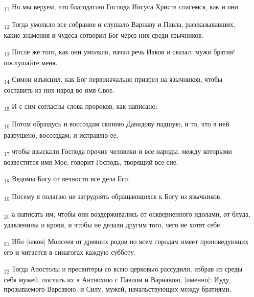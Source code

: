 \begin{tcolorbox}
\textsubscript{11} Но мы веруем, что благодатию Господа Иисуса Христа спасемся, как и они.
\end{tcolorbox}
\begin{tcolorbox}
\textsubscript{12} Тогда умолкло все собрание и слушало Варнаву и Павла, рассказывавших, какие знамения и чудеса сотворил Бог через них среди язычников.
\end{tcolorbox}
\begin{tcolorbox}
\textsubscript{13} После же того, как они умолкли, начал речь Иаков и сказал: мужи братия! послушайте меня.
\end{tcolorbox}
\begin{tcolorbox}
\textsubscript{14} Симон изъяснил, как Бог первоначально призрел на язычников, чтобы составить из них народ во имя Свое.
\end{tcolorbox}
\begin{tcolorbox}
\textsubscript{15} И с сим согласны слова пророков, как написано:
\end{tcolorbox}
\begin{tcolorbox}
\textsubscript{16} Потом обращусь и воссоздам скинию Давидову падшую, и то, что в ней разрушено, воссоздам, и исправлю ее,
\end{tcolorbox}
\begin{tcolorbox}
\textsubscript{17} чтобы взыскали Господа прочие человеки и все народы, между которыми возвестится имя Мое, говорит Господь, творящий все сие.
\end{tcolorbox}
\begin{tcolorbox}
\textsubscript{18} Ведомы Богу от вечности все дела Его.
\end{tcolorbox}
\begin{tcolorbox}
\textsubscript{19} Посему я полагаю не затруднять обращающихся к Богу из язычников,
\end{tcolorbox}
\begin{tcolorbox}
\textsubscript{20} а написать им, чтобы они воздерживались от оскверненного идолами, от блуда, удавленины и крови, и чтобы не делали другим того, чего не хотят себе.
\end{tcolorbox}
\begin{tcolorbox}
\textsubscript{21} Ибо [закон] Моисеев от древних родов по всем городам имеет проповедующих его и читается в синагогах каждую субботу.
\end{tcolorbox}
\begin{tcolorbox}
\textsubscript{22} Тогда Апостолы и пресвитеры со всею церковью рассудили, избрав из среды себя мужей, послать их в Антиохию с Павлом и Варнавою, [именно]: Иуду, прозываемого Варсавою, и Силу, мужей, начальствующих между братиями,
\end{tcolorbox}
